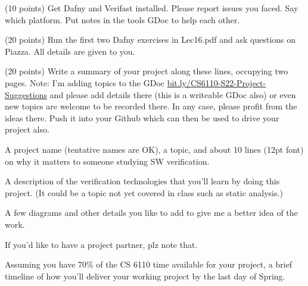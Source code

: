 \documentclass[11pt]{article}
\begin{document}
\begin{compactenum}
\begin{compactenum}
\begin{compactenum}
    \item (10 points)
      Get Dafny and Verifast installed. Please report issues you faced.
      Say which platform. Put notes in the tools GDoc to help each other.
    \end{compactenum}
    
  \item (20 points)
    Run the first two Dafny exercises in Lec16.pdf and ask questions
    on Piazza. All details are given to you.
  \end{compactenum}


  
\begin{minipage}{\minpagw}
\end{minipage}

\item (20 points)
  Write a summary of your project along these lines, occupying two pages.
  Note: I'm adding topics to the GDoc
  \url{bit.ly/CS6110-S22-Project-Suggestions}
  and please add details there (this is a writeable GDoc also) or even
  new topics are welcome to be recorded there. In any case, please
  profit from the ideas there.
  Push it into your Github which can then be used to drive your project also.
  \begin{compactitem}
  \item A project name (tentative names are OK), a topic,
    and about 10 lines (12pt font) on why it matters to
    someone studying SW verification.
    
  \item A description of the verification technologies that you'll learn
    by doing this project. (It could be a topic not yet covered in class
    such as static analysis.)

  \item A few diagrams and other details you like to add to give me a better
    idea of the work.

  \item If you'd like to have a project partner, plz note that.

  \item Assuming you have 70\% of the CS 6110 time available for your
    project, a brief timeline of how you'll deliver your working project
    by the last day of Spring.
  \end{compactitem}
  
\begin{minipage}{\minpagw}
\end{minipage}  
  


\end{compactenum}
\end{document}
